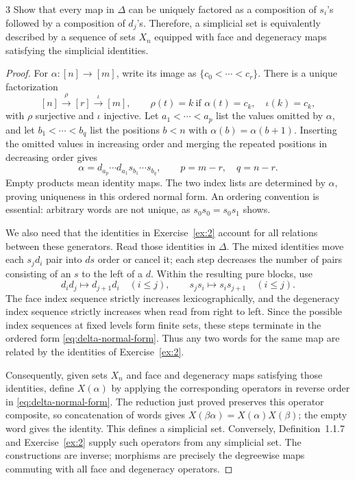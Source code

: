 \begin{exercise}{3}
Show that every map in $\Delta$ can be uniquely factored as a
composition of $s_i$'s followed by a composition of $d_j$'s. Therefore,
a simplicial set is equivalently described by a sequence of sets $X_n$
equipped with face and degeneracy maps satisfying the simplicial
identities.

\begin{proof}
For $\alpha\colon[n]\to[m]$, write its image as
$\{c_0<\cdots<c_r\}$. There is a unique factorization
\[
 [n]\xrightarrow{\rho}[r]\xrightarrow{\iota}[m],\qquad
 \rho(t)=k\ \text{if }\alpha(t)=c_k,\quad \iota(k)=c_k,
\]
with $\rho$ surjective and $\iota$ injective.
Let $a_1<\cdots<a_p$ list the values omitted by $\alpha$, and let
$b_1<\cdots<b_q$ list the positions $b<n$ with
$\alpha(b)=\alpha(b+1)$. Inserting the omitted values in increasing
order and merging the repeated positions in decreasing order gives
\begin{equation}\label{eq:delta-normal-form}
 \alpha=d_{a_p}\cdots d_{a_1}s_{b_1}\cdots s_{b_q},
 \qquad p=m-r,\quad q=n-r.
\end{equation}
Empty products mean identity maps. The two index lists are determined
by $\alpha$, proving uniqueness in this ordered normal form.
An ordering convention is essential: arbitrary words are not unique,
as $s_0s_0=s_0s_1$ shows.

We also need that the identities in Exercise~\ref{ex:2} account for
all relations between these generators. Read those identities in
$\Delta$. The mixed identities move each $s_jd_i$ pair into $ds$ order
or cancel it; each step decreases the number of pairs consisting of
an $s$ to the left of a $d$. Within the resulting pure blocks, use
\[
 d_id_j\longmapsto d_{j+1}d_i\quad(i\le j),\qquad
 s_js_i\longmapsto s_is_{j+1}\quad(i\le j).
\]
The face index sequence strictly increases lexicographically, and the
degeneracy index sequence strictly increases when read from right to
left. Since the possible index sequences at fixed levels form finite
sets, these steps terminate in the ordered form
\eqref{eq:delta-normal-form}. Thus any two words for the same map are
related by the identities of Exercise~\ref{ex:2}.

Consequently, given sets $X_n$ and face and degeneracy maps satisfying
those identities, define $X(\alpha)$ by applying the corresponding
operators in reverse order in \eqref{eq:delta-normal-form}.
The reduction just proved preserves this operator composite, so
concatenation of words gives
$X(\beta\alpha)=X(\alpha)X(\beta)$; the empty word gives the identity.
This defines a simplicial set. Conversely, Definition~1.1.7 and
Exercise~\ref{ex:2} supply such operators from any simplicial set.
The constructions are inverse; morphisms are precisely the degreewise
maps commuting with all face and degeneracy operators.
\end{proof}
\end{exercise}
